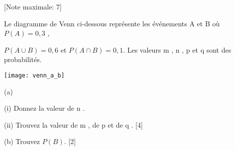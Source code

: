 \begin{question}
  \hspace*{\fill} [Note maximale: 7]\par
  \medskip

  \noindent Le diagramme de Venn ci-dessous représente les événements A et B où $P(A) = 0,3$ ,\par
  
  \noindent $P(A \cup B) = 0,6 $ et $P(A \cap B) = 0,1$. Les valeurs m , n , p et q sont des probabilités. \par

  \medskip

  \texttt{[image: venn\_a\_b]}\par  
  \medskip
  

  (a)\par
  \hspace{2em}(i)  Donnez la valeur de n .\par
  \hspace{2em}(ii) Trouvez la valeur de m , de p et de q .\hspace*{\fill} [4]\par
  
  \medskip
  
  (b) Trouvez $P(B)$.\hspace*{\fill} [2]\par
  
\end{question}

